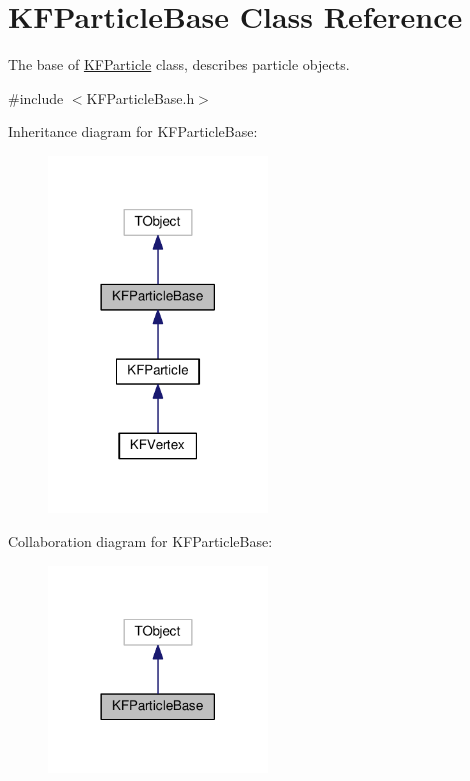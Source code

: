 \hypertarget{classKFParticleBase}{}\section{K\+F\+Particle\+Base Class Reference}
\label{classKFParticleBase}


The base of \hyperlink{classKFParticle}{K\+F\+Particle} class, describes particle objects.  




{\ttfamily \#include $<$K\+F\+Particle\+Base.\+h$>$}



Inheritance diagram for K\+F\+Particle\+Base\+:\nopagebreak
\begin{figure}[H]
\begin{center}
\leavevmode
\includegraphics[width=165pt]{classKFParticleBase__inherit__graph}
\end{center}
\end{figure}


Collaboration diagram for K\+F\+Particle\+Base\+:\nopagebreak
\begin{figure}[H]
\begin{center}
\leavevmode
\includegraphics[width=165pt]{classKFParticleBase__coll__graph}
\end{center}
\end{figure}
